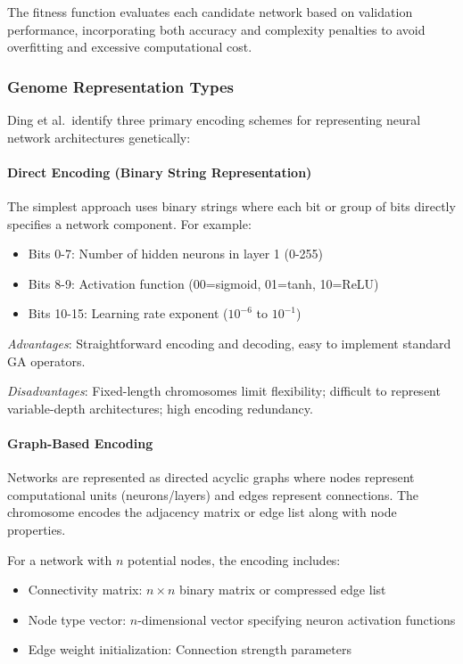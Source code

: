 The fitness function evaluates each candidate network based on validation performance, incorporating both accuracy and complexity penalties to avoid overfitting and excessive computational cost.

\subsubsection{Genome Representation Types}

Ding et al.\ identify three primary encoding schemes for representing neural network architectures genetically:

\paragraph{Direct Encoding (Binary String Representation)}
The simplest approach uses binary strings where each bit or group of bits directly specifies a network component. For example:
\begin{itemize}
    \item Bits 0-7: Number of hidden neurons in layer 1 (0-255)
    \item Bits 8-9: Activation function (00=sigmoid, 01=tanh, 10=ReLU)
    \item Bits 10-15: Learning rate exponent ($10^{-6}$ to $10^{-1}$)
\end{itemize}

\textit{Advantages}: Straightforward encoding and decoding, easy to implement standard GA operators.

\textit{Disadvantages}: Fixed-length chromosomes limit flexibility; difficult to represent variable-depth architectures; high encoding redundancy.

\paragraph{Graph-Based Encoding}
Networks are represented as directed acyclic graphs where nodes represent computational units (neurons/layers) and edges represent connections. The chromosome encodes the adjacency matrix or edge list along with node properties.

For a network with $n$ potential nodes, the encoding includes:
\begin{itemize}
    \item Connectivity matrix: $n \times n$ binary matrix or compressed edge list
    \item Node type vector: $n$-dimensional vector specifying neuron activation functions
    \item Edge weight initialization: Connection strength parameters
\end{itemize}

